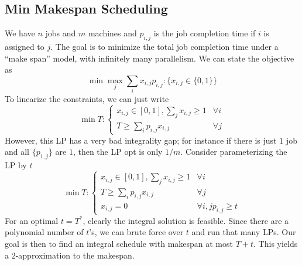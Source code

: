 \subsection{Min Makespan Scheduling}
We have $n$ jobs and $m$ machines and $p_{i,j}$ is the job completion time if $i$ is assigned
to $j$. The goal is to minimize the total job completion time under a ``make span'' model,
with infinitely many parallelism. We can state the objective as
\[ \min \max_{j} \sum_{i} x_{i,j } p_{i,j} : \{ x_{i,j} \in \{0, 1\} \} \]
To linearize the constraints, we can just write
\[ \min T : \begin{cases}
    x_{i,j} \in [0, 1], \sum_{j} x_{i, j} \ge 1 & \forall i \\
    T \ge \sum_{i} p_{i,j} x_{i,j} & \forall j 
\end{cases} \]
However, this LP has a very bad integrality gap; for instance if there is just $1$ job and
all $\{p_{1, j}\}$ are $1$, then the LP opt is only $1/m$.
Consider parameterizing the LP by $t$
\[ \min T : \begin{cases}
    x_{i,j} \in [0, 1], \sum_{j} x_{i, j} \ge 1 & \forall i \\
    T \ge \sum_{i} p_{i,j} x_{i,j} & \forall j \\
    x_{i,j} = 0 & \forall i,j p_{i,j} \ge t
\end{cases} 
\]
For an optimal $t = T^*$, clearly the integral solution is feasible.
Since there are a polynomial number of $t$'s, we can brute force over $t$
and run that many LPs.
Our goal is then to find an integral schedule with makespan at most $T + t$.
This yields a $2$-approximation to the makespan.

